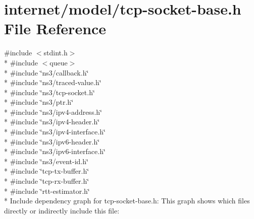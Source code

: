 \hypertarget{tcp-socket-base_8h}{}\section{internet/model/tcp-\/socket-\/base.h File Reference}
\label{tcp-socket-base_8h}
{\ttfamily \#include $<$stdint.\+h$>$}\\*
{\ttfamily \#include $<$queue$>$}\\*
{\ttfamily \#include \char`\"{}ns3/callback.\+h\char`\"{}}\\*
{\ttfamily \#include \char`\"{}ns3/traced-\/value.\+h\char`\"{}}\\*
{\ttfamily \#include \char`\"{}ns3/tcp-\/socket.\+h\char`\"{}}\\*
{\ttfamily \#include \char`\"{}ns3/ptr.\+h\char`\"{}}\\*
{\ttfamily \#include \char`\"{}ns3/ipv4-\/address.\+h\char`\"{}}\\*
{\ttfamily \#include \char`\"{}ns3/ipv4-\/header.\+h\char`\"{}}\\*
{\ttfamily \#include \char`\"{}ns3/ipv4-\/interface.\+h\char`\"{}}\\*
{\ttfamily \#include \char`\"{}ns3/ipv6-\/header.\+h\char`\"{}}\\*
{\ttfamily \#include \char`\"{}ns3/ipv6-\/interface.\+h\char`\"{}}\\*
{\ttfamily \#include \char`\"{}ns3/event-\/id.\+h\char`\"{}}\\*
{\ttfamily \#include \char`\"{}tcp-\/tx-\/buffer.\+h\char`\"{}}\\*
{\ttfamily \#include \char`\"{}tcp-\/rx-\/buffer.\+h\char`\"{}}\\*
{\ttfamily \#include \char`\"{}rtt-\/estimator.\+h\char`\"{}}\\*
Include dependency graph for tcp-\/socket-\/base.h\+:
This graph shows which files directly or indirectly include this file\+:
